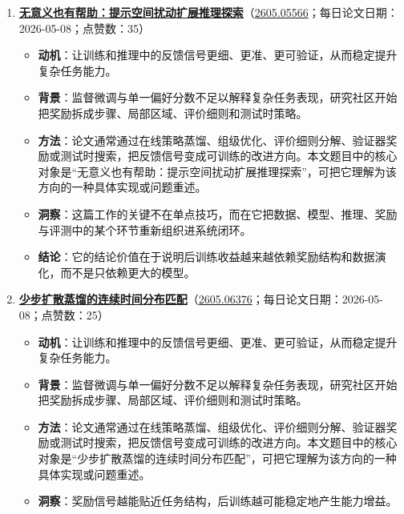 \begin{enumerate}[leftmargin=1.5em]
\begin{itemize}[leftmargin=1.5em]
    \item \textbf{洞察}：奖励信号越能贴近任务结构，后训练越可能稳定地产生能力增益。
    \item \textbf{结论}：它的结论价值在于说明后训练收益越来越依赖奖励结构和数据演化，而不是只依赖更大的模型。
  \end{itemize}
  \item \textbf{\href{https://huggingface.co/papers/2605.05566}{无意义也有帮助：提示空间扰动扩展推理探索}}（\href{https://arxiv.org/abs/2605.05566}{2605.05566}；每日论文日期：2026-05-08；点赞数：35）
  \begin{itemize}[leftmargin=1.5em]
    \item \textbf{动机}：让训练和推理中的反馈信号更细、更准、更可验证，从而稳定提升复杂任务能力。
    \item \textbf{背景}：监督微调与单一偏好分数不足以解释复杂任务表现，研究社区开始把奖励拆成步骤、局部区域、评价细则和测试时策略。
    \item \textbf{方法}：论文通常通过在线策略蒸馏、组级优化、评价细则分解、验证器奖励或测试时搜索，把反馈信号变成可训练的改进方向。本文题目中的核心对象是“无意义也有帮助：提示空间扰动扩展推理探索”，可把它理解为该方向的一种具体实现或问题重述。
    \item \textbf{洞察}：这篇工作的关键不在单点技巧，而在它把数据、模型、推理、奖励与评测中的某个环节重新组织进系统闭环。
    \item \textbf{结论}：它的结论价值在于说明后训练收益越来越依赖奖励结构和数据演化，而不是只依赖更大的模型。
  \end{itemize}
  \item \textbf{\href{https://huggingface.co/papers/2605.06376}{少步扩散蒸馏的连续时间分布匹配}}（\href{https://arxiv.org/abs/2605.06376}{2605.06376}；每日论文日期：2026-05-08；点赞数：25）
  \begin{itemize}[leftmargin=1.5em]
    \item \textbf{动机}：让训练和推理中的反馈信号更细、更准、更可验证，从而稳定提升复杂任务能力。
    \item \textbf{背景}：监督微调与单一偏好分数不足以解释复杂任务表现，研究社区开始把奖励拆成步骤、局部区域、评价细则和测试时策略。
    \item \textbf{方法}：论文通常通过在线策略蒸馏、组级优化、评价细则分解、验证器奖励或测试时搜索，把反馈信号变成可训练的改进方向。本文题目中的核心对象是“少步扩散蒸馏的连续时间分布匹配”，可把它理解为该方向的一种具体实现或问题重述。
    \item \textbf{洞察}：奖励信号越能贴近任务结构，后训练越可能稳定地产生能力增益。

\end{itemize}
\end{enumerate}
